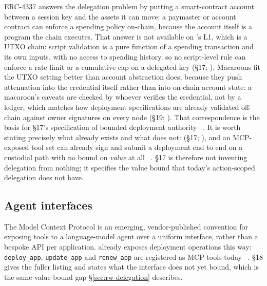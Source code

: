 ERC-4337 \citep{erc4337} answers the delegation problem by putting a smart-contract account between a
session key and the assets it can move: a paymaster or account contract can enforce a spending policy
on-chain, because the account itself is a program the chain executes. That answer is not available on
\Flux's L1, which is a UTXO chain: script validation is a pure function of a spending transaction and
its own inputs, with no access to spending history, so no script-level rule can enforce a rate limit or
a cumulative cap on a delegated key (§17; ). Macaroons
\citep{birgisson2014macaroons} fit the UTXO setting better than account abstraction does, because they
push attenuation into the credential itself rather than into on-chain account state: a macaroon's
caveats are checked by whoever verifies the credential, not by a ledger, which matches how deployment
specifications are already validated off-chain against owner signatures on every node (§19;
). That correspondence is the basis for §17's specification of bounded
deployment authority \planned\ . It is worth stating precisely what already exists and
what does not:  (§17; ), and an
MCP-exposed tool set can already sign and submit a deployment end to end on a custodial path with no
bound on \emph{value} at all \shipped\
. §17 is therefore not inventing
delegation from nothing; it specifies the value bound that today's action-scoped delegation does not
have.

\subsection{Agent interfaces}

The Model Context Protocol \citep{mcp} is an emerging, vendor-published convention for exposing tools
to a language-model agent over a uniform interface, rather than a bespoke API per application. \Flux
already exposes deployment operations this way: \texttt{deploy\_app}, \texttt{update\_app} and
\texttt{renew\_app} are registered as MCP tools today \shipped\
. §18 gives the fuller listing
and states what the interface does not yet bound, which is the same value-bound gap \S\ref{sec:rw-delegation} describes.

